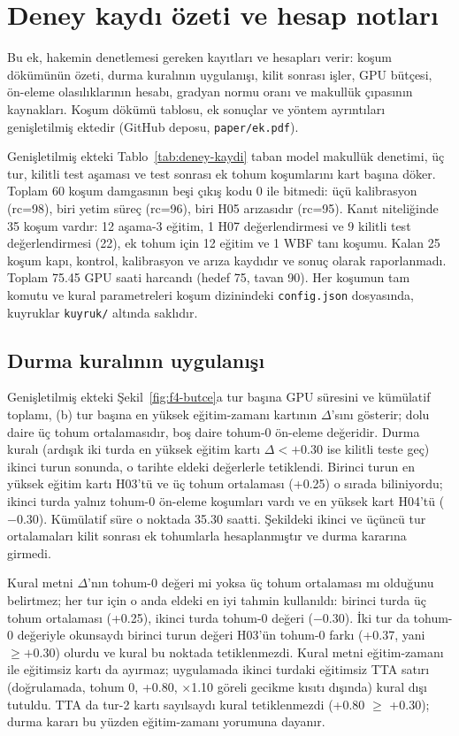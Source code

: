 \section{Deney kaydı özeti ve hesap notları}\label{sec:deney-kaydi}

Bu ek, hakemin denetlemesi gereken kayıtları ve hesapları verir: koşum dökümünün özeti, durma kuralının uygulanışı, kilit sonrası işler, GPU bütçesi, ön-eleme olasılıklarının hesabı, gradyan normu oranı ve makullük çıpasının kaynakları. Koşum dökümü tablosu, ek sonuçlar ve yöntem ayrıntıları genişletilmiş ektedir (GitHub deposu, \texttt{paper/ek.pdf}).

Genişletilmiş ekteki Tablo~\ref{tab:deney-kaydi} taban model makullük denetimi, üç tur, kilitli test aşaması ve test sonrası ek tohum koşumlarını kart başına döker. Toplam 60 koşum damgasının beşi çıkış kodu 0 ile bitmedi: üçü kalibrasyon (rc=98), biri yetim süreç (rc=96), biri H05 arızasıdır (rc=95). Kanıt niteliğinde 35 koşum vardır: 12 aşama-3 eğitim, 1 H07 değerlendirmesi ve 9 kilitli test değerlendirmesi (22), ek tohum için 12 eğitim ve 1 WBF tanı koşumu. Kalan 25 koşum kapı, kontrol, kalibrasyon ve arıza kaydıdır ve sonuç olarak raporlanmadı. Toplam 75.45 GPU saati harcandı (hedef 75, tavan 90). Her koşumun tam komutu ve kural parametreleri koşum dizinindeki \texttt{config.json} dosyasında, kuyruklar \texttt{kuyruk/} altında saklıdır.

\subsection{Durma kuralının uygulanışı}\label{sec:ek-durma}
Genişletilmiş ekteki Şekil~\ref{fig:f4-butce}a tur başına GPU süresini ve kümülatif toplamı, (b) tur başına en yüksek eğitim-zamanı kartının $\Delta$'sını gösterir; dolu daire üç tohum ortalamasıdır, boş daire tohum-0 ön-eleme değeridir. Durma kuralı (ardışık iki turda en yüksek eğitim kartı $\Delta<+0.30$ ise kilitli teste geç) ikinci turun sonunda, o tarihte eldeki değerlerle tetiklendi. Birinci turun en yüksek eğitim kartı H03'tü ve üç tohum ortalaması (+0.25) o sırada biliniyordu; ikinci turda yalnız tohum-0 ön-eleme koşumları vardı ve en yüksek kart H04'tü ($-$0.30). Kümülatif süre o noktada 35.30 saatti. Şekildeki ikinci ve üçüncü tur ortalamaları kilit sonrası ek tohumlarla hesaplanmıştır ve durma kararına girmedi.

Kural metni $\Delta$'nın tohum-0 değeri mi yoksa üç tohum ortalaması mı olduğunu belirtmez; her tur için o anda eldeki en iyi tahmin kullanıldı: birinci turda üç tohum ortalaması (+0.25), ikinci turda tohum-0 değeri ($-$0.30). İki tur da tohum-0 değeriyle okunsaydı birinci turun değeri H03'ün tohum-0 farkı (+0.37, yani $\ge+0.30$) olurdu ve kural bu noktada tetiklenmezdi. Kural metni eğitim-zamanı ile eğitimsiz kartı da ayırmaz; uygulamada ikinci turdaki eğitimsiz TTA satırı (doğrulamada, tohum 0, +0.80, $\times$1.10 göreli gecikme kısıtı dışında) kural dışı tutuldu. TTA da tur-2 kartı sayılsaydı kural tetiklenmezdi (+0.80 $\ge$ +0.30); durma kararı bu yüzden eğitim-zamanı yorumuna dayanır.

